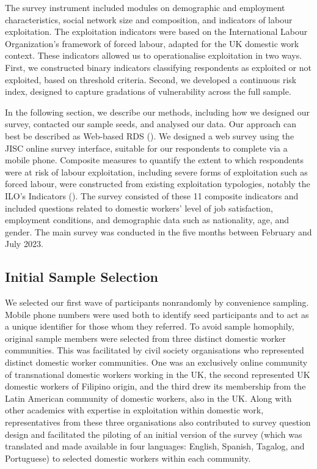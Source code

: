 \documentclass[
  12pt,
  letterpaper,
  DIV=11,
  numbers=noendperiod]{scrartcl}
\theoremstyle{plain}
\theoremstyle{definition}
\begin{document}
The survey instrument included modules on demographic and employment
characteristics, social network size and composition, and indicators of
labour exploitation. The exploitation indicators were based on the
International Labour Organization's framework of forced labour, adapted
for the UK domestic work context. These indicators allowed us to
operationalise exploitation in two ways. First, we constructed binary
indicators classifying respondents as exploited or not exploited, based
on threshold criteria. Second, we developed a continuous risk index,
designed to capture gradations of vulnerability across the full sample.

In the following section, we describe our methods, including how we
designed our survey, contacted our sample seeds, and analysed our data.
Our approach can best be described as Web-based RDS
(\textcite{wejnert_web-based_2008}). We designed a web survey using the
JISC online survey interface, suitable for our respondents to complete
via a mobile phone. Composite measures to quantify the extent to which
respondents were at risk of labour exploitation, including severe forms
of exploitation such as forced labour, were constructed from existing
exploitation typologies, notably the ILO's Indicators
(\textcite{ILO11-indicators}). The survey consisted of these 11
composite indicators and included questions related to domestic workers'
level of job satisfaction, employment conditions, and demographic data
such as nationality, age, and gender. The main survey was conducted in
the five months between February and July 2023.

\subsection{Initial Sample Selection}\label{initial-sample-selection}

We selected our first wave of participants nonrandomly by convenience
sampling. Mobile phone numbers were used both to identify seed
participants and to act as a unique identifier for those whom they
referred. To avoid sample homophily, original sample members were
selected from three distinct domestic worker communities. This was
facilitated by civil society organisations who represented distinct
domestic worker communities. One was an exclusively online community of
transnational domestic workers working in the UK, the second represented
UK domestic workers of Filipino origin, and the third drew its
membership from the Latin American community of domestic workers, also
in the UK. Along with other academics with expertise in exploitation
within domestic work, representatives from these three organisations
also contributed to survey question design and facilitated the piloting
of an initial version of the survey (which was translated and made
available in four languages: English, Spanish, Tagalog, and Portuguese)
to selected domestic workers within each community.
\end{document}
